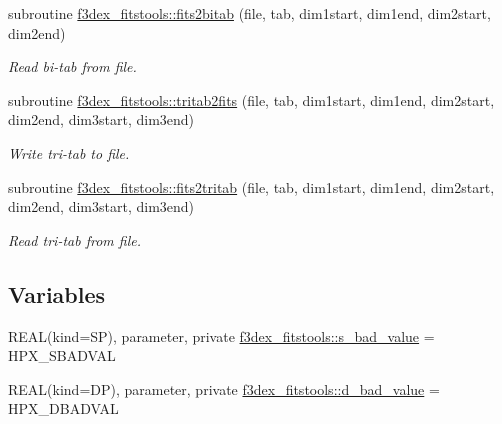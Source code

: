 \begin{DoxyCompactItemize}
subroutine \hyperlink{namespacef3dex__fitstools_a5c4a0cf23d0152d7449eb2afb09ad563}{f3dex\_\-fitstools::fits2bitab} (file, tab, dim1start, dim1end, dim2start, dim2end)
\begin{DoxyCompactList}\small\item\em Read bi-\/tab from file. \end{DoxyCompactList}\item 
subroutine \hyperlink{namespacef3dex__fitstools_a98c44872e5b5937bef4cccfcc2a21c43}{f3dex\_\-fitstools::tritab2fits} (file, tab, dim1start, dim1end, dim2start, dim2end, dim3start, dim3end)
\begin{DoxyCompactList}\small\item\em Write tri-\/tab to file. \end{DoxyCompactList}\item 
subroutine \hyperlink{namespacef3dex__fitstools_a1daf125726e201b6f4f84e709e23ccc0}{f3dex\_\-fitstools::fits2tritab} (file, tab, dim1start, dim1end, dim2start, dim2end, dim3start, dim3end)
\begin{DoxyCompactList}\small\item\em Read tri-\/tab from file. \end{DoxyCompactList}\end{DoxyCompactItemize}
\subsection*{Variables}
\begin{DoxyCompactItemize}
\item 
REAL(kind=SP), parameter, private \hyperlink{namespacef3dex__fitstools_a7841ef704a851792da5858a872caa0e4}{f3dex\_\-fitstools::s\_\-bad\_\-value} = HPX\_\-SBADVAL
\item 
REAL(kind=DP), parameter, private \hyperlink{namespacef3dex__fitstools_ae70f4f4f98f16a18e429bfd5f014d650}{f3dex\_\-fitstools::d\_\-bad\_\-value} = HPX\_\-DBADVAL
\end{DoxyCompactItemize}
